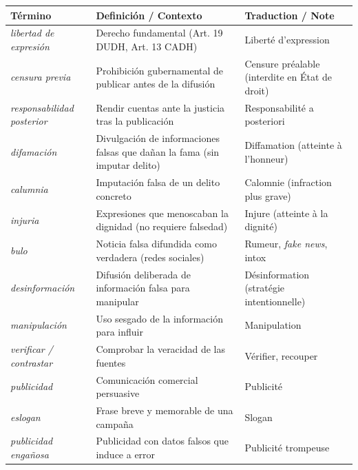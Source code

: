 \documentclass[11pt]{article}
\newcommand{\esp}[1]{\ifmmode\text{\textit{#1}}\else\begingroup\selectlanguage{spanish}\itshape #1\endgroup\fi}
\begin{document}
\begin{aretenir}
\begin{center}
\begin{tabularx}{\linewidth}{|X|X|X|}
\hline
\rowcolor{popblueL} \textbf{Término} & \textbf{Definición / Contexto} & \textbf{Traduction / Note} \\
\hline
\esp{libertad de expresión} & Derecho fundamental (Art. 19 DUDH, Art. 13 CADH) & Liberté d'expression \\
\hline
\esp{censura previa} & Prohibición gubernamental de publicar antes de la difusión & Censure préalable (interdite en État de droit) \\
\hline
\esp{responsabilidad posterior} & Rendir cuentas ante la justicia tras la publicación & Responsabilité a posteriori \\
\hline
\esp{difamación} & Divulgación de informaciones falsas que dañan la fama (sin imputar delito) & Diffamation (atteinte à l'honneur) \\
\hline
\esp{calumnia} & Imputación falsa de un delito concreto & Calomnie (infraction plus grave) \\
\hline
\esp{injuria} & Expresiones que menoscaban la dignidad (no requiere falsedad) & Injure (atteinte à la dignité) \\
\hline
\esp{bulo} & Noticia falsa difundida como verdadera (redes sociales) & Rumeur, \emph{fake news}, intox \\
\hline
\esp{desinformación} & Difusión deliberada de información falsa para manipular & Désinformation (stratégie intentionnelle) \\
\hline
\esp{manipulación} & Uso sesgado de la información para influir & Manipulation \\
\hline
\esp{verificar} / \esp{contrastar} & Comprobar la veracidad de las fuentes & Vérifier, recouper \\
\hline
\esp{publicidad} & Comunicación comercial persuasive & Publicité \\
\hline
\esp{eslogan} & Frase breve y memorable de una campaña & Slogan \\
\hline
\esp{publicidad engañosa} & Publicidad con datos falsos que induce a error & Publicité trompeuse \\
\hline
\end{tabularx}
\end{center}
\end{aretenir}
\end{document}
